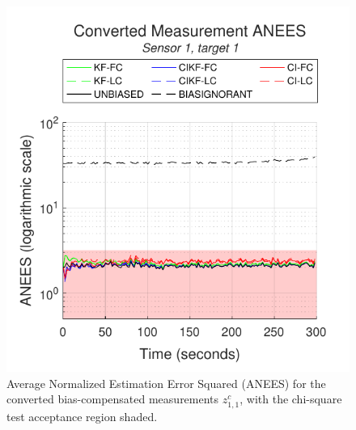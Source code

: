\documentclass[journal]{IEEEtran}
\begin{document}
\begin{figure}[ht]
    \centering
    \includegraphics[scale=0.85]{measurement_anees_s1t1.pdf}
    \caption{Average Normalized Estimation Error Squared (ANEES) for the converted bias-compensated measurements $z_{1,1}^{c}$, with the chi-square test acceptance region shaded.}
    \label{fig:resultsmeasurementaneess1t1}
\end{figure}
\end{document}
